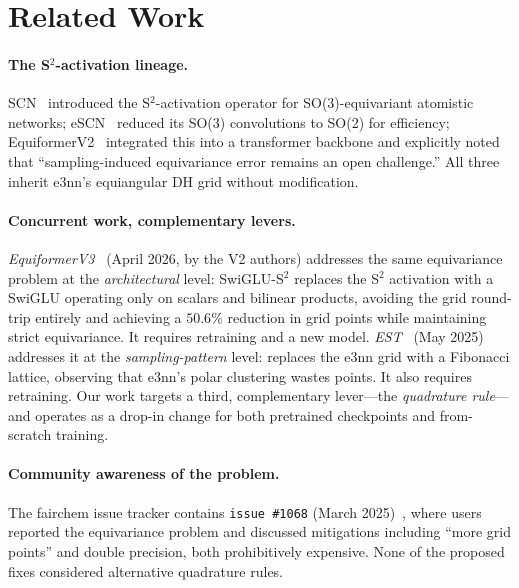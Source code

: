 \documentclass{article}
\begin{document}
\section{Related Work}
\label{sec:related}

\paragraph{The S$^2$-activation lineage.}
SCN~\cite{scn} introduced the S$^2$-activation operator for
SO(3)-equivariant atomistic networks; eSCN~\cite{escn} reduced its
SO(3) convolutions to SO(2) for efficiency; EquiformerV2~\cite
{equiformerv2} integrated this into a transformer backbone and
explicitly noted that ``sampling-induced equivariance error remains
an open challenge.'' All three inherit e3nn's equiangular DH grid
without modification.

\paragraph{Concurrent work, complementary levers.}
\emph{EquiformerV3}~\cite{equiformerv3} (April 2026, by the V2
authors) addresses the same equivariance problem at the
\emph{architectural} level: SwiGLU-S$^2$ replaces the S$^2$ activation
with a SwiGLU operating only on scalars and bilinear products,
avoiding the grid round-trip entirely and achieving a $50.6\%$
reduction in grid points while maintaining strict equivariance. It
requires retraining and a new model.
\emph{EST}~\cite{est} (May 2025) addresses it at the
\emph{sampling-pattern} level: replaces the e3nn grid with a
Fibonacci lattice, observing that e3nn's polar clustering wastes
points. It also requires retraining.
Our work targets a third, complementary lever---the \emph{quadrature
rule}---and operates as a drop-in change for both pretrained
checkpoints and from-scratch training.

\paragraph{Community awareness of the problem.}
The fairchem issue tracker contains \texttt{issue \#1068} (March
2025)~\cite{fairchem1068}, where users reported the equivariance
problem and discussed mitigations including ``more grid points''
and double precision, both prohibitively expensive. None of the
proposed fixes considered alternative quadrature rules.
\end{document}
